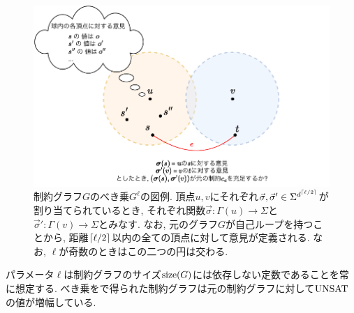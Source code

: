 \begin{figure}[h]
  \centering
  \includegraphics[width=\textwidth]{images/gap_amplification.pdf}
  \caption{制約グラフ$G$のべき乗$G^\ell$の図例. 頂点$u,v$にそれぞれ$\vec{\sigma},\vec{\sigma}'\in\Sigma^{d^{\lceil\ell/2\rceil}}$が割り当てられているとき, それぞれ関数$\vec{\sigma}\colon \Gamma(u)\to\Sigma$と$\vec{\sigma}'\colon \Gamma(v)\to\Sigma$とみなす. なお, 元のグラフ$G$が自己ループを持つことから, 距離$\lceil\ell/2\rceil$以内の全ての頂点に対して意見が定義される. なお, $\ell$が奇数のときはこの二つの円は交わる. \label{fig:gap-amplification}}
\end{figure}

パラメータ$\ell$は制約グラフのサイズ$\mathrm{size}(G)$には依存しない定数であることを常に想定する.
べき乗をで得られた制約グラフは元の制約グラフに対して$\mathrm{UNSAT}$の値が増幅している.

